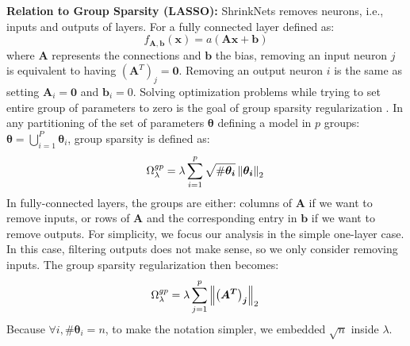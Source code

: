 \noindent\textbf{Relation to Group Sparsity (LASSO): } ShrinkNets removes neurons,
i.e., inputs and outputs of layers. For a fully connected layer defined as:
%
\begin{equation} \label{fully_connected}
  f_{\bm{A}, \bm{b}}(\bm{x})=a(\bm{Ax + b})
\end{equation}
%
where $\bm{A}$ represents the connections and $\bm{b}$ the bias,
removing an input neuron $j$ is equivalent to having $\left(\bm{A}^T\right)_j =
\bm{0}$. Removing an output neuron $i$ is the same as setting $\bm{A}_i = \bm{0}$
and $\bm{b}_i = 0$. Solving optimization problems while trying to set entire
group of parameters to zero is the goal of group sparsity regularization
\cite{Scardapane2017}. In  any partitioning of the set of parameters $\bm{\theta}$ defining a model in $p$
groups: $\bm{\theta} = \bigcup_{i=1}^P \bm{\theta}_i$, group sparsity is defined as: 
%
\begin{equation}
  \Omega_\lambda^{gp} = \lambda \sum_{i=1}^p \sqrt{\#\bm{\theta_i}} \left\lVert\bm{\theta_i}\right\rVert_2 \\
\end{equation}
%
 
In fully-connected layers, the groups are either: columns of
$\bm{A}$ if we want to remove inputs, or rows of $\bm{A}$ and the corresponding
entry in $\bm{b}$ if we want to remove outputs. For simplicity, we focus
our analysis in the simple one-layer case. In this case, filtering outputs does
not make sense, so we only consider removing inputs. The
group sparsity regularization then becomes:
%
\begin{equation} \label{group_sparsity_regularization}
  \Omega_\lambda^{gp} = \lambda \sum_{j=1}^p \left\lVert\bm{\left(A^T\right)_j}\right\rVert_2 \\
\end{equation}
%
Because $\forall i, \#\bm{\theta}_i = n$,   to make the notation simpler, we
embedded $\sqrt{n}$ inside $\lambda$.

